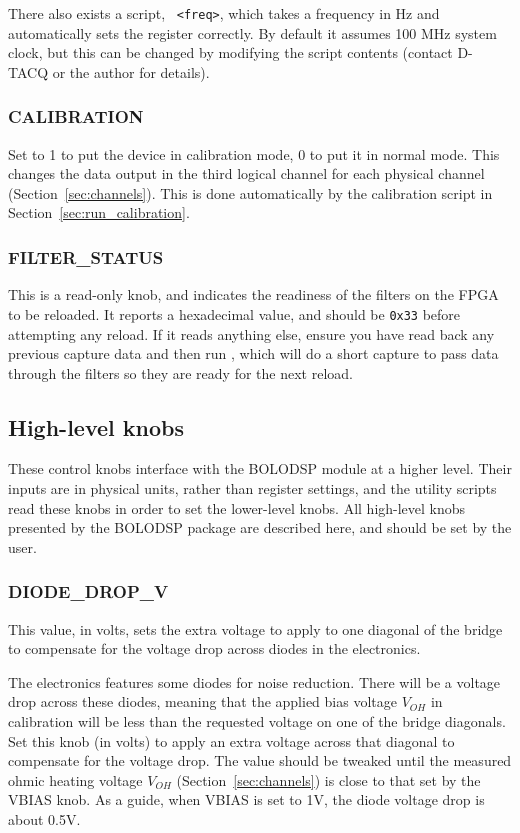 \documentclass[12pt,a4paper]{article}
\begin{document}
There also exists a script, \mbox{~\texttt{<freq>}}, which takes a frequency in Hz and automatically sets the register
correctly. By default it assumes 100 MHz system clock, but this can be changed by modifying the script contents (contact D-TACQ or the author for
details).

\subsubsection{CALIBRATION}
Set to 1 to put the device in calibration mode, 0 to put it in normal mode. This changes the data output in the third logical channel for each physical
channel (Section~\ref{sec:channels}). This is done automatically by the calibration script in Section~\ref{sec:run_calibration}.

\subsubsection{FILTER{\_}STATUS}
This is a read-only knob, and indicates the readiness of the filters on the FPGA to be reloaded. It reports a hexadecimal value, and should be
\texttt{0x33} before attempting any reload. If it reads anything else, ensure you have read back any previous capture data and then run
\mbox{}, which will do a short capture to pass data through the filters so they are ready for the next reload.

\subsection{High-level knobs}
\label{sec:knobshl}
These control knobs interface with the BOLODSP module at a higher level. Their inputs are in physical units, rather than register settings, and the
utility scripts read these knobs in order to set the lower-level knobs. All high-level knobs presented by the BOLODSP package are described here, and
should be set by the user.

\subsubsection{DIODE{\_}DROP{\_}V}
This value, in volts, sets the extra voltage to apply to one diagonal of the bridge to compensate for the voltage drop across diodes in the electronics.

The electronics features some diodes for noise reduction. There will be a voltage drop across these diodes, meaning that the applied bias voltage $V_{OH}$
in calibration will be less than the requested voltage on one of the bridge diagonals. Set this knob (in volts) to apply an extra voltage across that
diagonal to compensate for the voltage drop. The value should be tweaked until the measured ohmic heating voltage $V_{OH}$ (Section~\ref{sec:channels}) is
close to that set by the VBIAS knob. As a guide, when VBIAS is set to 1V, the diode voltage drop is about 0.5V.
\end{document}
